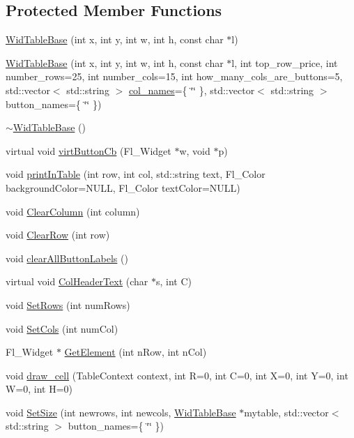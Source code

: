 \subsection*{Protected Member Functions}
\begin{DoxyCompactItemize}
\item 
\hyperlink{class_mike_1_1_wid_table_base_aa9d89f83f34c4ce8f0655ff3437374a5}{Wid\+Table\+Base} (int x, int y, int w, int h, const char $\ast$l)
\item 
\hyperlink{class_mike_1_1_wid_table_base_aa2cee360b485c40a08c556da54ffa439}{Wid\+Table\+Base} (int x, int y, int w, int h, const char $\ast$l, int top\+\_\+row\+\_\+price, int number\+\_\+rows=25, int number\+\_\+cols=15, int how\+\_\+many\+\_\+cols\+\_\+are\+\_\+buttons=5, std\+::vector$<$ std\+::string $>$ \hyperlink{class_mike_1_1_wid_table_base_acc76591b1fa97f8259fc95f492d8e1b9}{col\+\_\+names}=\{ \char`\"{}\char`\"{} \}, std\+::vector$<$ std\+::string $>$ button\+\_\+names=\{ \char`\"{}\char`\"{} \})
\item 
\hyperlink{class_mike_1_1_wid_table_base_a66c2828fd13a8abf4f5faa274e632542}{$\sim$\+Wid\+Table\+Base} ()
\item 
virtual void \hyperlink{class_mike_1_1_wid_table_base_aed65d79c6e84fd89abceaf6ffa079fad}{virt\+Button\+Cb} (Fl\+\_\+\+Widget $\ast$w, void $\ast$p)
\item 
void \hyperlink{class_mike_1_1_wid_table_base_a22ff7af61bac2dc33e596e68a236b845}{print\+In\+Table} (int row, int col, std\+::string text, Fl\+\_\+\+Color background\+Color=N\+U\+LL, Fl\+\_\+\+Color text\+Color=N\+U\+LL)
\item 
void \hyperlink{class_mike_1_1_wid_table_base_af7acb57a8144c9ab4e01a8300469b98e}{Clear\+Column} (int column)
\item 
void \hyperlink{class_mike_1_1_wid_table_base_a17021ef3e4cea06939284891dc27d61f}{Clear\+Row} (int row)
\item 
void \hyperlink{class_mike_1_1_wid_table_base_a4779181b9c1eebc13406f9093d665236}{clear\+All\+Button\+Labels} ()
\item 
virtual void \hyperlink{class_mike_1_1_wid_table_base_a980add59d3d60f68517b48a896e5eb3c}{Col\+Header\+Text} (char $\ast$s, int C)
\item 
void \hyperlink{class_mike_1_1_wid_table_base_a3486b3282392458231cb09f9d9a4e504}{Set\+Rows} (int num\+Rows)
\item 
void \hyperlink{class_mike_1_1_wid_table_base_a52555afc3c0f71ae166d862258303447}{Set\+Cols} (int num\+Col)
\item 
Fl\+\_\+\+Widget $\ast$ \hyperlink{class_mike_1_1_wid_table_base_a5c2de58aec7fa3751862b68f18031f88}{Get\+Element} (int n\+Row, int n\+Col)
\item 
void \hyperlink{class_mike_1_1_wid_table_base_a1a463c054dfd0dc563dedf0fbdaf3232}{draw\+\_\+cell} (Table\+Context context, int R=0, int C=0, int X=0, int Y=0, int W=0, int H=0)
\item 
void \hyperlink{class_mike_1_1_wid_table_base_a23f12c24def459d1dde1c53a7e237d4a}{Set\+Size} (int newrows, int newcols, \hyperlink{class_mike_1_1_wid_table_base}{Wid\+Table\+Base} $\ast$mytable, std\+::vector$<$ std\+::string $>$ button\+\_\+names=\{ \char`\"{}\char`\"{} \})
\end{DoxyCompactItemize}
